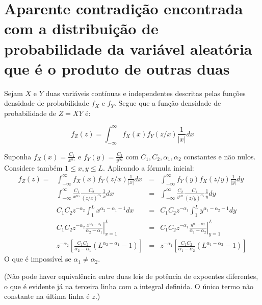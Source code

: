 \documentclass{article}
\begin{document}
\section{Aparente contradição encontrada com a distribuição de probabilidade da variável aleatória que é o produto de outras duas}


Sejam $X$ e $Y$ duas variáveis contínuas e independentes descritas
pelas funções densidade de probabilidade $f_X$ e $f_Y$.
Segue que a função densidade de probabilidade de $Z=XY$ é:

\begin{equation}
f_Z(z) = \int_{-\infty}^{\infty} f_X(x) f_Y(z/x)\frac{1}{|x|}dx
\end{equation}

\noindent Suponha 
$f_X(x)=\frac{C_1}{x^{\alpha_1}}$
e
$f_Y(y)=\frac{C_2}{y^{\alpha_2}}$
com $C_1, C_2, \alpha_1, \alpha_2$ constantes e não nulos.
Considere também $1 \leq x,y \leq L$.
Aplicando a fórmula inicial:
\begin{align}
f_Z(z) = & \int_{-\infty}^{\infty} f_X(x) f_Y(z/x)\frac{1}{|x|}dx & = & \int_{-\infty}^{\infty} f_Y(y) f_X(z/y)\frac{1}{|y|}dy\\
& \int_{-\infty}^{\infty} \frac{C_1}{x^{\alpha_1}} \frac{C_2}{(z/x)^{\alpha_2}}\frac{1}{x}dx & = & \int_{-\infty}^{\infty} \frac{C_2}{y^{\alpha_2}} \frac{C_1}{(z/y)^{\alpha_1}}\frac{1}{y}dy\\
& C_1 C_2 z^{-\alpha_2} \int_{1}^{L} x^{\alpha_2-\alpha_1-1} dx & = & C_1 C_2 z^{-\alpha_1} \int_{1}^{L} y^{\alpha_1-\alpha_2-1} dy\\
& C_1 C_2 z^{-\alpha_2} \left. \frac{x^{\alpha_2-\alpha_1}}{\alpha_2-\alpha_1}\right|_{x=1}^{L} & = & C_1 C_2 z^{-\alpha_1} \left. \frac{y^{\alpha_1-\alpha_2}}{\alpha_1-\alpha_2}\right|_{y=1}^{L}  \\
& z^{-\alpha_2} \left[ \frac{C_1 C_2}{\alpha_2-\alpha_1} (L^{\alpha_2-\alpha_1} -1)\right] & = & z^{-\alpha_1} \left[\frac{C_1 C_2}{\alpha_1-\alpha_2} (L^{\alpha_1-\alpha_2} -1)\right]
\end{align}
\noindent O que é impossível se $\alpha_1 \neq \alpha_2$.

(Não pode haver equivalência entre duas leis de potência de expoentes diferentes,
o que é evidente já na terceira linha com a integral definida.
O único termo não constante na última linha é $z$.)

\end{document}
